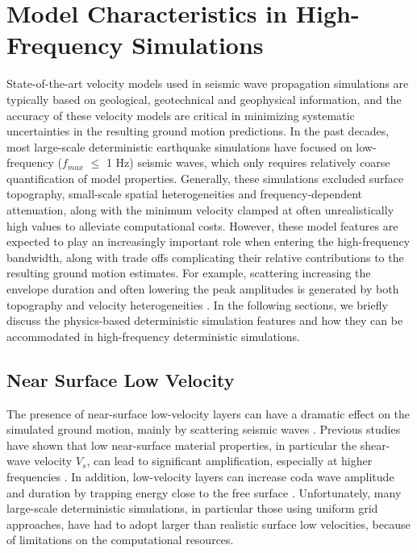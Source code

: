 \section{Model Characteristics in High-Frequency Simulations}

State-of-the-art velocity models used in seismic wave propagation simulations are typically based on geological, geotechnical and geophysical information, and the accuracy of these velocity models are critical in minimizing systematic uncertainties in the resulting ground motion predictions. In the past decades, most large-scale deterministic earthquake simulations have focused on low-frequency ($f_{max}$ $\leqslant$ 1 Hz) seismic waves, which only requires relatively coarse quantification of model properties. Generally, these simulations excluded surface topography, small-scale spatial heterogeneities and frequency-dependent attenuation, along with the minimum velocity clamped at often unrealistically high values to alleviate computational costs. However, these model features are expected to play an increasingly important role when entering the high-frequency bandwidth, along with trade offs complicating their relative contributions to the resulting ground motion estimates. For example, scattering increasing the envelope duration and often lowering the peak amplitudes is generated by both topography and velocity heterogeneities \citet{laiShallowBasinStructure2020}.
In the following sections, we briefly discuss the physics-based deterministic simulation features and how they can be accommodated in high-frequency deterministic simulations.


\subsection{Near Surface Low Velocity}
The presence of near-surface low-velocity layers can have a dramatic effect on the simulated ground motion, mainly by scattering seismic waves . Previous studies have shown that low near-surface material properties, in particular the shear-wave velocity $V_s$, can lead to significant amplification, especially at higher frequencies \citep{booreSiteAmplificationsGeneric1997,poggiDerivationReferenceShearWave2011}. In addition, low-velocity layers can increase coda wave amplitude and duration by trapping energy close to the free surface \citep{imperatoriBroadbandNearfieldGround2013}. Unfortunately, many large-scale deterministic simulations, in particular those using uniform grid approaches, have had to adopt larger than realistic surface low velocities, because of limitations on the computational resources.

